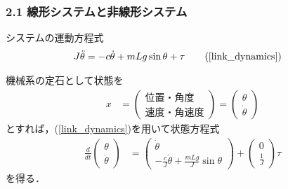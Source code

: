 \begin{frame}[t]
\frametitle{2.1 線形システムと非線形システム}
システムの運動方程式
\begin{align}
	J \ddot{\theta} &=  -c \dot{\theta} 
				+ m L g \sin \theta 
				+ \tau
\tag{\ref{link_dynamics}}
\end{align}

機械系の定石として状態を
\begin{align}
	x&
	=	\left(\begin{array}{c} 
			\mbox{位置・角度} \\ 
			\mbox{速度・角速度}
		\end{array}\right)
	=	\left(\begin{array}{c} 
			\theta \\ 
			\dot{\theta} 
		\end{array}\right)
\end{align}
とすれば，(\ref{link_dynamics})を用いて状態方程式
\begin{align}
	\frac{d}{dt} \left(\begin{array}{c} 
			\theta \\ 
			\dot{\theta} 
		      \end{array}\right)
			&=  \left(\begin{array}{c}
				\dot{\theta} \\
				- \frac{c}{J} \dot{\theta}
				+ \frac{m L g}{J} \sin \theta 
 			      \end{array}\right)
				+ \left(\begin{array}{c}
					0 \\
					\frac{1}{J}
				  \end{array}\right)
				  \tau
\label{link_orsys}
\end{align}
を得る．
\end{frame}

